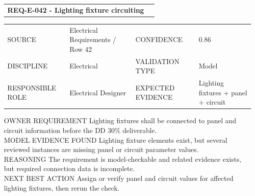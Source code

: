\documentclass[10pt,letterpaper]{article}
\newcommand{\smalllabel}[1]{{\scriptsize\textcolor{emaMuted}{\MakeUppercase{#1}}}}
\newcommand{\badge}[3]{\tcbox[on line,colback=#2,colframe=#2,boxrule=0pt,arc=2mm,left=5pt,right=5pt,top=2pt,bottom=2pt]{\scriptsize\textbf{\textcolor{#3}{#1}}}}
\newcommand{\notmetbadge}{\badge{Not Met}{emaRedBg}{emaRed}}
\begin{document}
\begin{tcolorbox}[colback=white,colframe=emaRedBg,boxrule=0.9pt,borderline west={3pt}{0pt}{emaRed}]
\begin{tabularx}{\textwidth}{X r}
{\large\bfseries\textcolor{emaNavy}{REQ-E-042 - Lighting fixture circuiting}} & \notmetbadge \\
\end{tabularx}
\begin{tabularx}{\textwidth}{p{1.25in}X p{1.1in}X}
\smalllabel{Source} & Electrical Requirements / Row 42 & \smalllabel{Confidence} & 0.86 \\
\smalllabel{Discipline} & Electrical & \smalllabel{Validation Type} & Model \\
\smalllabel{Responsible Role} & Electrical Designer & \smalllabel{Expected Evidence} & Lighting fixtures + panel + circuit \\
\end{tabularx}
\smalllabel{Owner Requirement} Lighting fixtures shall be connected to panel and circuit information before the DD 30\% deliverable.\\[3pt]
\smalllabel{Model Evidence Found} Lighting fixture elements exist, but several reviewed instances are missing panel or circuit parameter values.\\[3pt]
\smalllabel{Reasoning} The requirement is model-checkable and related evidence exists, but required connection data is incomplete.\\[3pt]
\smalllabel{Next Best Action} Assign or verify panel and circuit values for affected lighting fixtures, then rerun the check.
\end{tcolorbox}
\end{document}
